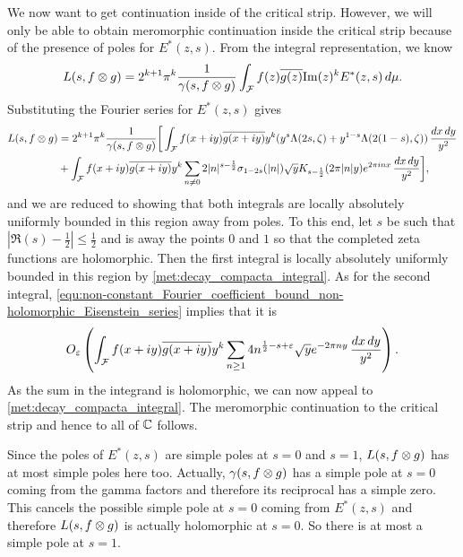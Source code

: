       We now want to get continuation inside of the critical strip. However, we will only be able to obtain meromorphic continuation inside the critical strip because of the presence of poles for $E^{\ast}(z,s)$. From the integral representation, we know
      \[
        L(s,f \otimes g) = 2^{k+1}\pi^{k}\frac{1}{\gamma(s,f \otimes g)}\int_{\mathcal{F}}f(z)\overline{g(z)}\mathrm{Im}(z)^{k}E^{\ast}(z,s)\,d\mu.
      \]
      Substituting the Fourier series for $E^{\ast}(z,s)$ gives
      \begin{equation}\label{equ:integral_representation_Rankin_Selberg}
        \begin{aligned}
          L(s,f \otimes g) &= 2^{k+1}\pi^{k}\frac{1}{\gamma(s,f \otimes g)}\bigg[\int_{\mathcal{F}}f(x+iy)\overline{g(x+iy)}y^{k}(y^{s}\Lambda(2s,\zeta)+y^{1-s}\Lambda(2(1-s),\zeta))\,\frac{dx\,dy}{y^{2}} \\
          &+\int_{\mathcal{F}}f(x+iy)\overline{g(x+iy)}y^{k}\sum_{n \neq 0}2|n|^{s-\frac{1}{2}}\sigma_{1-2s}(|n|)\sqrt{y}K_{s-\frac{1}{2}}(2\pi|n|y)e^{2\pi inx}\,\frac{dx\,dy}{y^{2}}\bigg],
        \end{aligned}
      \end{equation}
      and we are reduced to showing that both integrals are locally absolutely uniformly bounded in this region away from poles. To this end, let $s$ be such that $|\Re(s)-\frac{1}{2}| \le \frac{1}{2}$ and is away the points $0$ and $1$ so that the completed zeta functions are holomorphic. Then the first integral is locally absolutely uniformly bounded in this region by \cref{met:decay_compacta_integral}. As for the second integral, \cref{equ:non-constant_Fourier_coefficient_bound_non-holomorphic_Eisenstein_series} implies that it is
      \[
        O_{\varepsilon}\left(\int_{\mathcal{F}}f(x+iy)\overline{g(x+iy)}y^{k}\sum_{n \ge 1}4n^{\frac{1}{2}-s+\varepsilon}\sqrt{y}e^{-2\pi ny}\,\frac{dx\,dy}{y^{2}}\right).
      \]
      As the sum in the integrand is holomorphic, we can now appeal to \cref{met:decay_compacta_integral}. The meromorphic continuation to the critical strip and hence to all of $\mathbb{C}$ follows.

      Since the poles of $E^{\ast}(z,s)$ are simple poles at $s = 0$ and $s = 1$, $L(s,f \otimes g)$ has at most simple poles here too. Actually, $\gamma(s,f \otimes g)$ has a simple pole at $s = 0$ coming from the gamma factors and therefore its reciprocal has a simple zero. This cancels the possible simple pole at $s = 0$ coming from $E^{\ast}(z,s)$ and therefore $L(s,f \otimes g)$ is actually holomorphic at $s = 0$. So there is at most a simple pole at $s = 1$.
      
